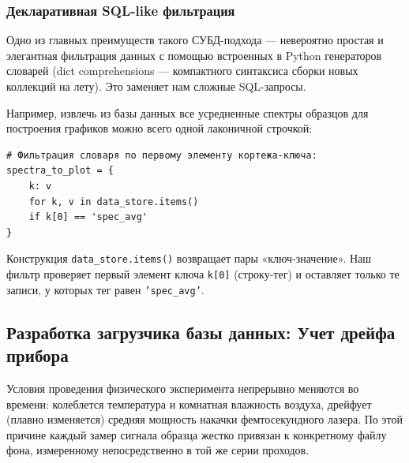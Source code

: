 \subsubsection{Декларативная SQL-like фильтрация}

Одно из главных преимуществ такого СУБД-подхода — невероятно простая и элегантная фильтрация данных с помощью встроенных в Python генераторов словарей (dict comprehensions — компактного синтаксиса сборки новых коллекций на лету). Это заменяет нам сложные SQL-запросы.

Например, извлечь из базы данных все усредненные спектры образцов для построения графиков можно всего одной лаконичной строчкой:
\begin{verbatim}
# Фильтрация словаря по первому элементу кортежа-ключа:
spectra_to_plot = {
    k: v 
    for k, v in data_store.items() 
    if k[0] == 'spec_avg'
}
\end{verbatim}

Конструкция \texttt{data\_store.items()} возвращает пары «ключ-значение». Наш фильтр проверяет первый элемент ключа \texttt{k[0]} (строку-тег) и оставляет только те записи, у которых тег равен \texttt{'spec\_avg'}.

\subsection{Разработка загрузчика базы данных: Учет дрейфа прибора}

Условия проведения физического эксперимента непрерывно меняются во времени: колеблется температура и комнатная влажность воздуха, дрейфует (плавно изменяется) средняя мощность накачки фемтосекундного лазера. По этой причине каждый замер сигнала образца жестко привязан к конкретному файлу фона, измеренному непосредственно в той же серии проходов.


